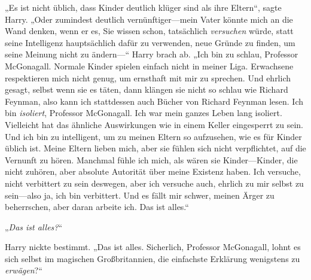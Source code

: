 „Es ist nicht üblich, dass Kinder deutlich klüger sind als ihre Eltern“, sagte Harry. „Oder zumindest deutlich vernünftiger—mein Vater könnte mich an die Wand denken, wenn er es, Sie wissen schon, tatsächlich \emph{versuchen} würde, statt seine Intelligenz hauptsächlich dafür zu verwenden, neue Gründe zu finden, um seine Meinung nicht zu ändern—“ Harry brach ab. „Ich bin zu schlau, Professor McGonagall. Normale Kinder spielen einfach nicht in meiner Liga. Erwachsene respektieren mich nicht genug, um ernsthaft mit mir zu sprechen. Und ehrlich gesagt, selbst wenn sie es täten, dann klängen sie nicht so schlau wie Richard Feynman, also kann ich stattdessen auch Bücher von Richard Feynman lesen. Ich bin \emph{isoliert}, Professor McGonagall. Ich war mein ganzes Leben lang isoliert. Vielleicht hat das ähnliche Auswirkungen wie in einem Keller eingesperrt zu sein. Und ich bin zu intelligent, um zu meinen Eltern so aufzusehen, wie es für Kinder üblich ist. Meine Eltern lieben mich, aber sie fühlen sich nicht verpflichtet, auf die Vernunft zu hören. Manchmal fühle ich mich, als wären sie Kinder—Kinder, die nicht zuhören, aber absolute Autorität über meine Existenz haben. Ich versuche, nicht verbittert zu sein deswegen, aber ich versuche auch, ehrlich zu mir selbst zu sein—also ja, ich bin verbittert. Und es fällt mir schwer, meinen Ärger zu beherrschen, aber daran arbeite ich. Das ist alles.“

„\emph{Das ist alles?}“

Harry nickte bestimmt. „Das ist alles. Sicherlich, Professor McGonagall, lohnt es sich selbst im magischen Großbritannien, die einfachste Erklärung wenigstens zu \emph{erwägen}?“

\later


